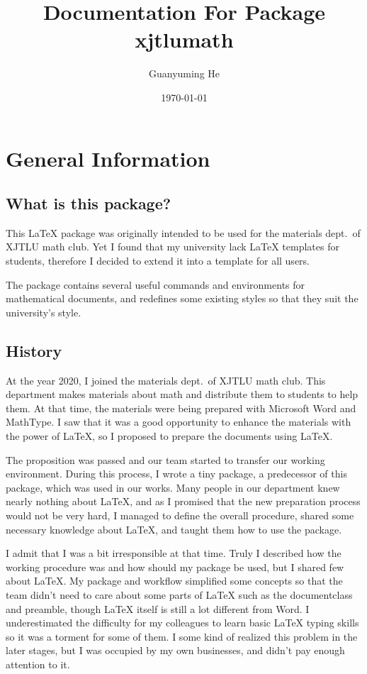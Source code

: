 \documentclass[oneside]{book}
\title{Documentation For Package xjtlumath}
\author{Guanyuming He}
\date{\today}
\begin{document}
\maketitle

\cleardoublepage
{}
\tableofcontents
	
\clearpage
\pagestyle{headings}
\chapter{General Information}
\section{What is this package?}
This \LaTeX{} package was originally intended to be used for the materials dept.~of XJTLU math club. Yet I found that my university lack \LaTeX{} templates for students, therefore I decided to extend it into a template for all users.

The package contains several useful commands and environments for mathematical documents, and redefines some existing styles so that they suit the university's style.

\section{History}
At the year 2020, I joined the materials dept.~of XJTLU math club. This department makes materials about math and distribute them to students to help them. At that time, the materials were being prepared with Microsoft Word and MathType. I saw that it was a good opportunity to enhance the materials with the power of \LaTeX, so I proposed to prepare the documents using \LaTeX.

The proposition was passed and our team started to transfer our working environment. During this process, I wrote a tiny package, a predecessor of this package, which was used in our works. Many people in our department knew nearly nothing about \LaTeX, and as I promised that the new preparation process would not be very hard, I managed to define the overall procedure, shared some necessary knowledge about \LaTeX, and taught them how to use the package.

I admit that I was a bit irresponsible at that time. Truly I described how the working procedure was and how should my package be used, but I shared few about \LaTeX. My package and workflow simplified some concepts so that the team didn't need to care about some parts of \LaTeX{} such as the documentclass and preamble, though \LaTeX{} itself is still a lot different from Word. I underestimated the difficulty for my colleagues to learn basic \LaTeX{} typing skills so it was a torment for some of them. I some kind of realized this problem in the later stages, but I was occupied by my own businesses, and didn't pay enough attention to it.
\end{document}
